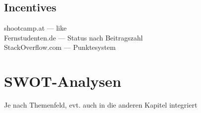 \subsection{Incentives} %
\label{sub:infentives}
shootcamp.at --- like\\
Fernstudenten.de --- Status nach Beitragszahl\\
StackOverflow.com --- Punktesystem


\section{SWOT-Analysen} %
\label{sec:swot_analysen}
Je nach  Themenfeld, evt. auch in die anderen Kapitel integriert
